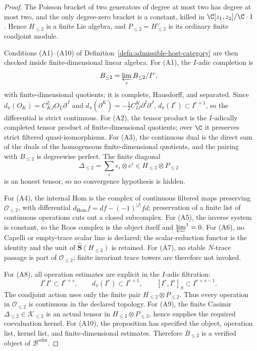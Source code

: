 \begin{proof}
  The Poisson bracket of two generators of degree at most two has degree
  at most two, and the only degree-zero bracket is a constant, killed in
  \(\C[z_1,z_2]/\C\cdot1\).  Hence \(H_{\leq2}\) is a finite Lie algebra,
  and \(P_{\leq2}=H_{\leq2}^{\vee}\) is its ordinary finite coadjoint
  module.

  Conditions (A1)--(A10) of
  Definition~\ref{defn:admissible-host-category} are then checked inside
  finite-dimensional linear algebra.  For (A1), the \(I\)-adic completion
  is
  \[
    B_{\leq2}=\varprojlim_r B_{\leq2}/I^r,
  \]
  with finite-dimensional quotients; it is complete, Hausdorff, and
  separated.  Since \(d_\pi(O_K)=C^L_{KJ}O_L\partial^J\) and
  \(d_\pi(\partial^K)=-\frac12C^K_{IJ}\partial^I\partial^J\),
  \(d_\pi(I^r)\subset I^{r+1}\), so the differential is strict
  continuous.  For (A2), the tensor product is the \(I\)-adically
  completed tensor product of finite-dimensional quotients; over \(\C\)
  it preserves strict filtered quasi-isomorphisms.  For (A3), the
  continuous dual is the direct sum of the duals of the homogeneous
  finite-dimensional quotients, and the pairing with \(B_{\leq2}\) is
  degreewise perfect.  The finite diagonal
  \[
    \Delta_{\leq2}=\sum_i e_i\otimes e^i
    \in H_{\leq2}\otimes P_{\leq2}
  \]
  is an honest tensor, so no convergence hypothesis is hidden.

  For (A4), the internal Hom is the complex of continuous filtered maps
  preserving \(\mathcal O_{\leq2}\), with differential
  \(d_{\mathrm{Hom}}f=d f-(-1)^{|f|}f d\); preservation of a finite list
  of continuous operations cuts out a closed subcomplex.  For (A5), the
  inverse system is constant, so the Roos complex is the object itself
  and \(\varprojlim^1=0\).  For (A6), no Capelli or empty-trace scalar
  line is declared; the scalar-reduction functor is the identity and the
  unit of \(\widehat{\mathbf S}(H_{\leq2})\) is retained.  For (A7), no
  stable \(N\)-trace passage is part of \(\mathcal O_{\leq2}\); finite
  invariant trace towers are therefore not invoked.

  For (A8), all operation estimates are explicit in the \(I\)-adic
  filtration:
  \[
    I^rI^s\subset I^{r+s},\qquad
    d_\pi(I^r)\subset I^{r+1},\qquad
    [I^r,I^s]_S\subset I^{r+s-1}.
  \]
  The coadjoint action uses only the finite pair
  \(H_{\leq2}\otimes P_{\leq2}\).  Thus every operation in
  \(\mathcal O_{\leq2}\) is continuous in the declared topology.  For
  (A9), the finite Casimir
  \(\Delta_{\leq2}\in\mathcal K_{\leq2}\) is an actual tensor in
  \(H_{\leq2}\otimes P_{\leq2}\), hence supplies the required
  coevaluation kernel.  For (A10), the proposition has specified the
  object, operation list, kernel list, and finite-dimensional estimates.
  Therefore \(B_{\leq2}\) is a verified object of
  \(\mathcal B^{\mathrm{adm}}\).
\end{proof}


